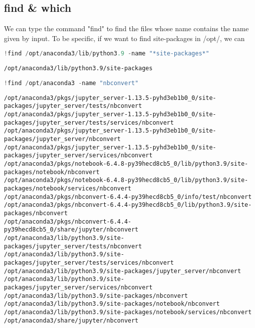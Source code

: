 \documentclass[
]{article}
\begin{document}
\hypertarget{144151c5}{}
\hypertarget{find--which}{%
\subsection{find \& which}\label{find--which}}

We can type the command "find" to find the files whose name contains the
name given by input. To be specific, if we want to find site-packages in
/opt/, we can

\hypertarget{e45b3c74}{}
\begin{lstlisting}[language=Python]
!find /opt/anaconda3/lib/python3.9 -name "*site-packages*"
\end{lstlisting}

\begin{lstlisting}
/opt/anaconda3/lib/python3.9/site-packages
\end{lstlisting}

\hypertarget{8350374f}{}
\begin{lstlisting}[language=Python]
!find /opt/anaconda3 -name "nbconvert"
\end{lstlisting}

\begin{lstlisting}
/opt/anaconda3/pkgs/jupyter_server-1.13.5-pyhd3eb1b0_0/site-packages/jupyter_server/tests/nbconvert
/opt/anaconda3/pkgs/jupyter_server-1.13.5-pyhd3eb1b0_0/site-packages/jupyter_server/tests/services/nbconvert
/opt/anaconda3/pkgs/jupyter_server-1.13.5-pyhd3eb1b0_0/site-packages/jupyter_server/nbconvert
/opt/anaconda3/pkgs/jupyter_server-1.13.5-pyhd3eb1b0_0/site-packages/jupyter_server/services/nbconvert
/opt/anaconda3/pkgs/notebook-6.4.8-py39hecd8cb5_0/lib/python3.9/site-packages/notebook/nbconvert
/opt/anaconda3/pkgs/notebook-6.4.8-py39hecd8cb5_0/lib/python3.9/site-packages/notebook/services/nbconvert
/opt/anaconda3/pkgs/nbconvert-6.4.4-py39hecd8cb5_0/info/test/nbconvert
/opt/anaconda3/pkgs/nbconvert-6.4.4-py39hecd8cb5_0/lib/python3.9/site-packages/nbconvert
/opt/anaconda3/pkgs/nbconvert-6.4.4-py39hecd8cb5_0/share/jupyter/nbconvert
/opt/anaconda3/lib/python3.9/site-packages/jupyter_server/tests/nbconvert
/opt/anaconda3/lib/python3.9/site-packages/jupyter_server/tests/services/nbconvert
/opt/anaconda3/lib/python3.9/site-packages/jupyter_server/nbconvert
/opt/anaconda3/lib/python3.9/site-packages/jupyter_server/services/nbconvert
/opt/anaconda3/lib/python3.9/site-packages/nbconvert
/opt/anaconda3/lib/python3.9/site-packages/notebook/nbconvert
/opt/anaconda3/lib/python3.9/site-packages/notebook/services/nbconvert
/opt/anaconda3/share/jupyter/nbconvert
\end{lstlisting}
\end{document}
